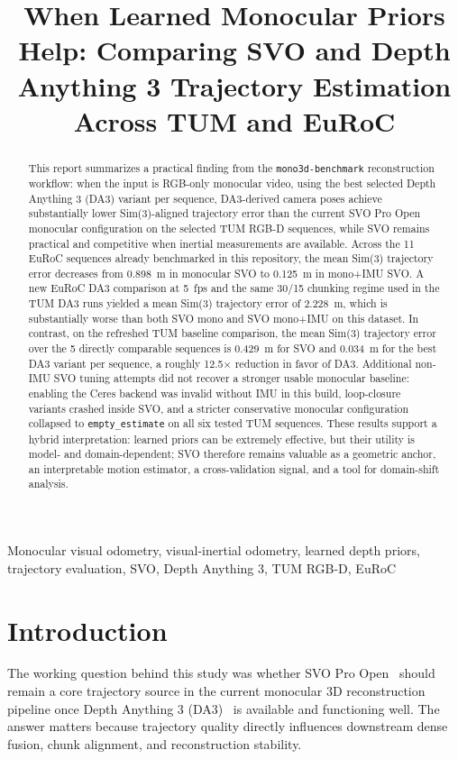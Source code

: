 \documentclass[conference]{IEEEtran}
\title{When Learned Monocular Priors Help: Comparing SVO and Depth Anything 3 Trajectory Estimation Across TUM and EuRoC}
\author{
\IEEEauthorblockN{Project Report Draft}
\IEEEauthorblockA{mono3d-benchmark Experimental Notes\\
June 10, 2026}
}
\newcommand{\code}[1]{\mbox{\texttt{#1}}}
\begin{document}
\maketitle

\begin{abstract}
This report summarizes a practical finding from the \texttt{mono3d-benchmark} reconstruction workflow: when the input is RGB-only monocular video, using the best selected Depth Anything 3 (DA3) variant per sequence, DA3-derived camera poses achieve substantially lower Sim(3)-aligned trajectory error than the current SVO Pro Open monocular configuration on the selected TUM RGB-D sequences, while SVO remains practical and competitive when inertial measurements are available. Across the 11 EuRoC sequences already benchmarked in this repository, the mean Sim(3) trajectory error decreases from 0.898~m in monocular SVO to 0.125~m in mono+IMU SVO. A new EuRoC DA3 comparison at 5~fps and the same 30/15 chunking regime used in the TUM DA3 runs yielded a mean Sim(3) trajectory error of 2.228~m, which is substantially worse than both SVO mono and SVO mono+IMU on this dataset. In contrast, on the refreshed TUM baseline comparison, the mean Sim(3) trajectory error over the 5 directly comparable sequences is 0.429~m for SVO and 0.034~m for the best DA3 variant per sequence, a roughly 12.5$\times$ reduction in favor of DA3. Additional non-IMU SVO tuning attempts did not recover a stronger usable monocular baseline: enabling the Ceres backend was invalid without IMU in this build, loop-closure variants crashed inside SVO, and a stricter conservative monocular configuration collapsed to \code{empty\_estimate} on all six tested TUM sequences. These results support a hybrid interpretation: learned priors can be extremely effective, but their utility is model- and domain-dependent; SVO therefore remains valuable as a geometric anchor, an interpretable motion estimator, a cross-validation signal, and a tool for domain-shift analysis.
\end{abstract}

\begin{IEEEkeywords}
Monocular visual odometry, visual-inertial odometry, learned depth priors, trajectory evaluation, SVO, Depth Anything 3, TUM RGB-D, EuRoC
\end{IEEEkeywords}

\section{Introduction}
The working question behind this study was whether SVO Pro Open~\cite{forster2017svo} should remain a core trajectory source in the current monocular 3D reconstruction pipeline once Depth Anything 3 (DA3)~\cite{lin2025depthanything3} is available and functioning well. The answer matters because trajectory quality directly influences downstream dense fusion, chunk alignment, and reconstruction stability.
\end{document}
